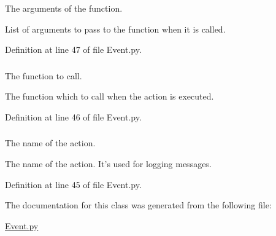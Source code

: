 The arguments of the function. 

List of arguments to pass to the function when it is called. 

Definition at line 47 of file Event.py.

\hypertarget{class_event_1_1_action_ad5e6ef3b81bd241bbff4583f0efdd851}{
\subsubsection[{\_\-\_\-function}]{}}
\label{class_event_1_1_action_ad5e6ef3b81bd241bbff4583f0efdd851}


The function to call. 

The function which to call when the action is executed. 

Definition at line 46 of file Event.py.

\hypertarget{class_event_1_1_action_a01e4cadf34243e09c4b67b9392fef22a}{
\subsubsection[{name}]{}}
\label{class_event_1_1_action_a01e4cadf34243e09c4b67b9392fef22a}


The name of the action. 

The name of the action. It's used for logging messages. 

Definition at line 45 of file Event.py.



The documentation for this class was generated from the following file:\begin{DoxyCompactItemize}
\item 
\hyperlink{_event_8py}{Event.py}\end{DoxyCompactItemize}
